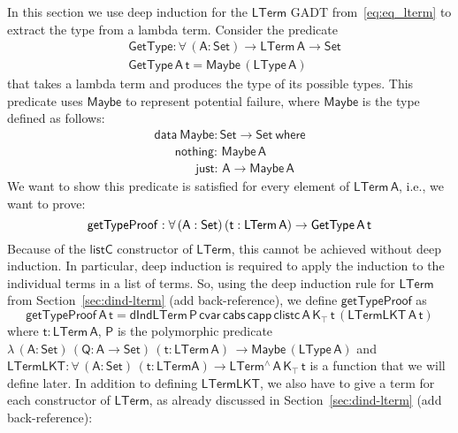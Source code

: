 \documentclass[9pt]{entcs}
\begin{document}
In this section we use deep induction for the $\mathsf{LTerm}$ GADT
from~\eqref{eq:eq_lterm} to extract the type from a lambda term.
Consider the predicate
\begin{align*}
  &\mathsf{GetType : \forall \, (A : Set) \to LTerm\,A \to Set} \\
  &\mathsf{GetType \,A \,t = Maybe \, (LType \, A)}
\end{align*}
that takes a lambda term and produces the type of its possible types.
This predicate uses $\mathsf{Maybe}$ to represent
potential failure, where $\mathsf{Maybe}$ is the type defined as follows:
\begin{equation}\label{eq:maybe}
\begin{array}{l}
\mathsf{data\ Maybe : Set \to Set\ where}\\
\mathsf{\;\;\;\;\;\;nothing :\, Maybe\,A}\\
\mathsf{\;\;\;\;\;\;\;\;\;\;\;\;just :\, A \to Maybe\,A}
\end{array}
\end{equation}
We want to show this predicate is satisfied for every element of $\mathsf{LTerm\,A}$,
i.e., we want to prove: 
\[
  \mathsf{getTypeProof : \forall \, (A : Set)\, (t : LTerm\,A) \to GetType \,A \,t} \\
\]
Because of the $\mathsf{listC}$ constructor of $\mathsf{LTerm}$, this cannot be achieved without 
deep induction. In particular, deep induction is required to apply the induction to the 
individual terms in a list of terms. 
So, using the deep induction rule for $\mathsf{LTerm}$ from Section~\ref{sec:dind-lterm} {\color{red} (add back-reference)},
we define $\mathsf{getTypeProof}$ as
\[
  \mathsf{getTypeProof \,A \,t = 
    dIndLTerm\, P \,
    cvar\,  cabs\,  capp\,  clistc\,  A\, K_\top\, t\, (LTermLKT\, A\, t)
    }
\]
where $\mathsf{t : LTerm\,A}$,
$\mathsf{P}$ is the polymorphic predicate $\mathsf{\lambda \, (A: Set)\, (Q : A \to Set)\, (t : LTerm\,A)\, \to Maybe \, (LType \, A)}$
and $\mathsf{LTermLKT : \forall\, (A : Set)\, (t : LTerm A) \to LTerm^{\wedge}\, A\, K_\top\,t}$
is a function that we will define later.
In addition to defining $\mathsf{LTermLKT}$,
we also have to give a term for each constructor of $\mathsf{LTerm}$,
as already discussed in Section~\ref{sec:dind-lterm} {\color{red} (add back-reference)}:
\end{document}
